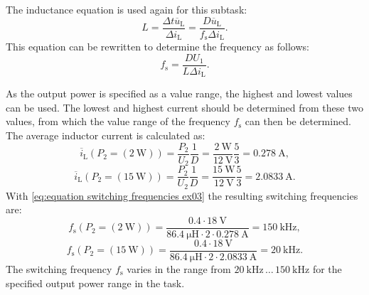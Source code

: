  \begin{solutionblock}
     The inductance equation is used again for this subtask:
     \begin{equation}
        L = \frac{\Delta t \overline u_{\mathrm{L}}}{\Delta i_{\mathrm{L}}}= \frac{D \overline u_{\mathrm{L}}}{f_\mathrm{s}\Delta i_{\mathrm{L}}}.
     \end{equation}
     This equation can be rewritten to determine the frequency as follows:
     \begin{equation}
        f_\mathrm{s} = \frac{DU_{\mathrm{1}}}{L\Delta i_{\mathrm{L}}}. \label{eq:equation switching frequencies ex03}
     \end{equation}
      
As the output power is specified as a value range, the highest and lowest values can be used. The lowest and highest current should be determined from these two values, from which the value range of the frequency $f_\mathrm{s}$ can then be determined.
The average inductor current is calculated as:
     \begin{equation}
        \overline{i}_\mathrm{L}(P_\mathrm{2}=(\SI{2}{\watt}))= \frac{P_\mathrm{2}}{U_\mathrm{2}}\frac{1}{D}=\frac{\SI{2}{\watt}}{\SI{12}{\volt}}\frac{5}{3}=\SI{0.278}{\ampere},
     \end{equation}
     \begin{equation}
        \overline{i}_\mathrm{L}(P_\mathrm{2}=(\SI{15}{\watt}))= \frac{P_\mathrm{2}}{U_\mathrm{2}}\frac{1}{D}=\frac{\SI{15}{\watt}}{\SI{12}{\volt}}\frac{5}{3}=\SI{2.0833}{\ampere}.
     \end{equation}
     With \eqref{eq:equation switching frequencies ex03} the resulting switching frequencies are:
     \begin{equation}
        f_\mathrm{s}(P_\mathrm{2}=(\SI{2}{\watt}))=\frac{0.4\cdot\SI{18}{\volt}}{\SI{86.4}{\micro\henry}\cdot 2\cdot \SI{0.278}{\ampere}}=\SI{150}{\kilo \hertz},
     \end{equation}
     \begin{equation}
        f_\mathrm{s}(P_\mathrm{2}=(\SI{15}{\watt}))=\frac{0.4\cdot\SI{18}{\volt}}{\SI{86.4}{\micro\henry}\cdot 2\cdot \SI{2.0833}{\ampere}}=\SI{20}{\kilo \hertz}.
     \end{equation}
     The switching frequency $f_\mathrm{s}$ varies in the range from $\SI{20}{\kilo \hertz} \, \dots \, \SI{150}{\kilo \hertz}$ for the specified output power range in the task.
 \end{solutionblock}

